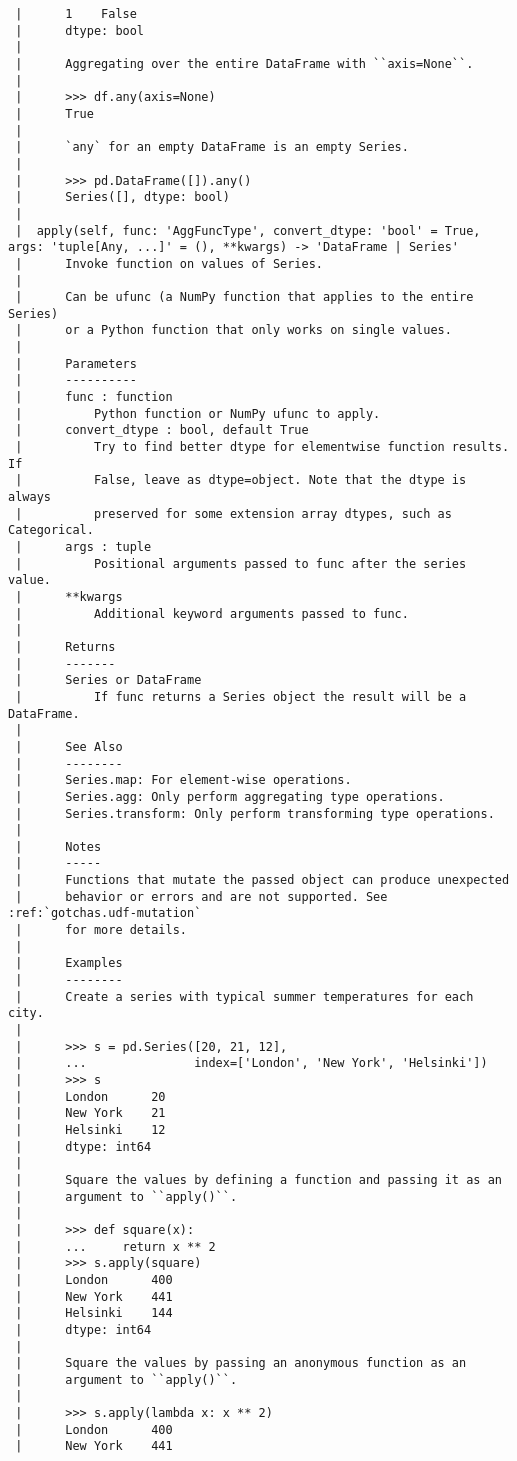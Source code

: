 \documentclass[
  letterpaper,
  DIV=11,
  numbers=noendperiod]{scrreprt}
\begin{document}
\begin{verbatim}
 |      1    False
 |      dtype: bool
 |      
 |      Aggregating over the entire DataFrame with ``axis=None``.
 |      
 |      >>> df.any(axis=None)
 |      True
 |      
 |      `any` for an empty DataFrame is an empty Series.
 |      
 |      >>> pd.DataFrame([]).any()
 |      Series([], dtype: bool)
 |  
 |  apply(self, func: 'AggFuncType', convert_dtype: 'bool' = True, args: 'tuple[Any, ...]' = (), **kwargs) -> 'DataFrame | Series'
 |      Invoke function on values of Series.
 |      
 |      Can be ufunc (a NumPy function that applies to the entire Series)
 |      or a Python function that only works on single values.
 |      
 |      Parameters
 |      ----------
 |      func : function
 |          Python function or NumPy ufunc to apply.
 |      convert_dtype : bool, default True
 |          Try to find better dtype for elementwise function results. If
 |          False, leave as dtype=object. Note that the dtype is always
 |          preserved for some extension array dtypes, such as Categorical.
 |      args : tuple
 |          Positional arguments passed to func after the series value.
 |      **kwargs
 |          Additional keyword arguments passed to func.
 |      
 |      Returns
 |      -------
 |      Series or DataFrame
 |          If func returns a Series object the result will be a DataFrame.
 |      
 |      See Also
 |      --------
 |      Series.map: For element-wise operations.
 |      Series.agg: Only perform aggregating type operations.
 |      Series.transform: Only perform transforming type operations.
 |      
 |      Notes
 |      -----
 |      Functions that mutate the passed object can produce unexpected
 |      behavior or errors and are not supported. See :ref:`gotchas.udf-mutation`
 |      for more details.
 |      
 |      Examples
 |      --------
 |      Create a series with typical summer temperatures for each city.
 |      
 |      >>> s = pd.Series([20, 21, 12],
 |      ...               index=['London', 'New York', 'Helsinki'])
 |      >>> s
 |      London      20
 |      New York    21
 |      Helsinki    12
 |      dtype: int64
 |      
 |      Square the values by defining a function and passing it as an
 |      argument to ``apply()``.
 |      
 |      >>> def square(x):
 |      ...     return x ** 2
 |      >>> s.apply(square)
 |      London      400
 |      New York    441
 |      Helsinki    144
 |      dtype: int64
 |      
 |      Square the values by passing an anonymous function as an
 |      argument to ``apply()``.
 |      
 |      >>> s.apply(lambda x: x ** 2)
 |      London      400
 |      New York    441

\end{verbatim}
\end{document}
